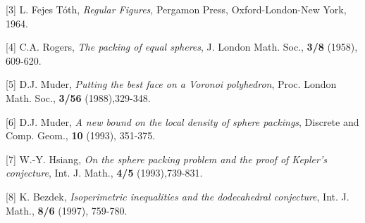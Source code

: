 [3] L. Fejes T\'oth, {\it Regular Figures}, Pergamon Press, Oxford-London-New York, 1964.


[4] C.A. Rogers, {\it The packing of equal spheres}, J. London Math. Soc.,
{\bf 3/8} (1958), 609-620.

[5] D.J. Muder, {\it Putting the best face on a Voronoi polyhedron}, 
Proc. London Math. Soc., {\bf 3/56} (1988),329-348.

[6] D.J. Muder, {\it A new bound on the local density of sphere packings}, 
Discrete and Comp. Geom., {\bf 10} (1993), 351-375.

[7] W.-Y. Hsiang, {\it On the sphere packing problem and the proof of Kepler's conjecture},
Int. J. Math., {\bf 4/5} (1993),739-831.

[8] K. Bezdek, {\it Isoperimetric inequalities and the dodecahedral conjecture}, Int. J. Math.,
{\bf 8/6} (1997), 759-780.







\bye

